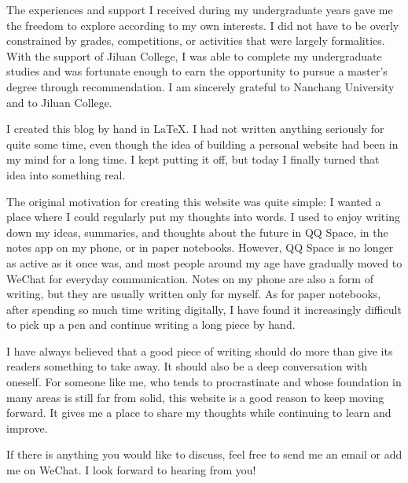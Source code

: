 \documentclass[UTF8,12pt,a4paper]{ctexart}
\begin{document}
	The experiences and support I received during my undergraduate years gave me the freedom to explore according to my own interests. I did not have to be overly constrained by grades, competitions, or activities that were largely formalities. With the support of Jiluan College, I was able to complete my undergraduate studies and was fortunate enough to earn the opportunity to pursue a master's degree through recommendation. I am sincerely grateful to Nanchang University and to Jiluan College.
	
	I created this blog by hand in \LaTeX{}. I had not written anything seriously for quite some time, even though the idea of building a personal website had been in my mind for a long time. I kept putting it off, but today I finally turned that idea into something real.
	
	The original motivation for creating this website was quite simple: I wanted a place where I could regularly put my thoughts into words. I used to enjoy writing down my ideas, summaries, and thoughts about the future in QQ Space, in the notes app on my phone, or in paper notebooks. However, QQ Space is no longer as active as it once was, and most people around my age have gradually moved to WeChat for everyday communication. Notes on my phone are also a form of writing, but they are usually written only for myself. As for paper notebooks, after spending so much time writing digitally, I have found it increasingly difficult to pick up a pen and continue writing a long piece by hand.
	
	I have always believed that a good piece of writing should do more than give its readers something to take away. It should also be a deep conversation with oneself. For someone like me, who tends to procrastinate and whose foundation in many areas is still far from solid, this website is a good reason to keep moving forward. It gives me a place to share my thoughts while continuing to learn and improve.
	
	If there is anything you would like to discuss, feel free to send me an email or add me on WeChat. I look forward to hearing from you!
	
	
	
\end{document}
